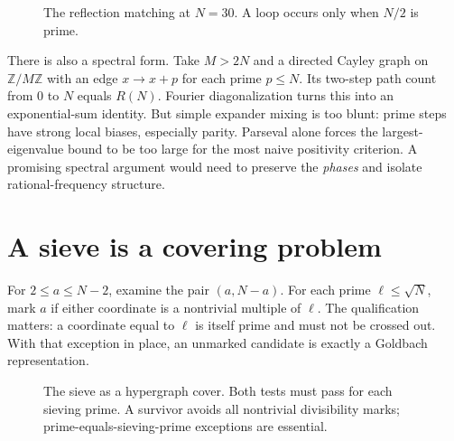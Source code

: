 \documentclass[11pt,a4paper]{article}
\begin{document}
\begin{figure}[htbp]
\centering
{}
\caption{The reflection matching at $N=30$. A loop occurs only when $N/2$ is prime.}
\end{figure}

There is also a spectral form. Take $M>2N$ and a directed Cayley graph on $\mathbb Z/M\mathbb Z$ with an edge $x\to x+p$ for each prime $p\le N$. Its two-step path count from $0$ to $N$ equals $R(N)$. Fourier diagonalization turns this into an exponential-sum identity. But simple expander mixing is too blunt: prime steps have strong local biases, especially parity. Parseval alone forces the largest-eigenvalue bound to be too large for the most naive positivity criterion. A promising spectral argument would need to preserve the \emph{phases} and isolate rational-frequency structure.

\section{A sieve is a covering problem}
For $2\le a\le N-2$, examine the pair $(a,N-a)$. For each prime $\ell\le\sqrt N$, mark $a$ if either coordinate is a nontrivial multiple of $\ell$. The qualification matters: a coordinate equal to $\ell$ is itself prime and must not be crossed out. With that exception in place, an unmarked candidate is exactly a Goldbach representation.

\begin{figure}[htbp]
\centering
{}
\caption{The sieve as a hypergraph cover. Both tests must pass for each sieving prime. A survivor avoids all nontrivial divisibility marks; prime-equals-sieving-prime exceptions are essential.}
\end{figure}
\end{document}
